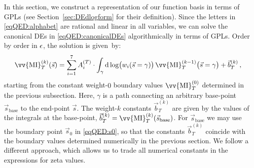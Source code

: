 \documentclass[main.tex]{subfiles}
\begin{document}
In this section, we construct a representation of our function basis in terms of GPLs (see Section~\ref{sec:DEdlogform} for their definition). %
Since the letters in \cref{eqQED:alphabet} are rational and linear in all variables, we can solve the canonical DEs in \cref{eqQED:canonicalDEs} algorithmically in terms of GPLs. Order by order in $\epsilon$, the solution is given~by:
\begin{align} \label{eqQED:solution}
\vv{\text{MI}}_T^{(k)}(\vec{s}) = \sum_{i=1}^7 A_i^{(T)} \cdot \int_{\gamma} \dd \log \bigl(w_i(\vec{s}=\gamma) \bigr) \,\vv{\text{MI}}_T^{(k-1)}\bigl(\vec{s}=\gamma\bigr) + \vec{b}^{(k)}_{T} \,,
\end{align}
starting from the constant weight-$0$ boundary values $\vv{\text{MI}}_T^{(0)}$ determined in the previous subsection. Here, $\gamma$ is a path connecting an arbitrary base-point $\vec{s}_{\mathrm{base}}$ to the end-point $\vec{s}$. The weight-$k$ constants $\vec{b}^{(k)}_{T} $ are given by the values of the integrals at the base-point, $ \vec{b}^{(k)}_{T} = \vv{\text{MI}}_T^{(k)}(\vec{s}_{\mathrm{base}})$.
For $\vec{s}_{\mathrm{base}}$ we may use the boundary point $\vec{s}_0$ in \cref{eqQED:s0}, so that the constants $\vec{b}^{(k)}_{T}$ coincide with the boundary values determined numerically in the previous section. We follow a different approach, which allows us to trade all numerical constants in the expressions for zeta values.
\end{document}
